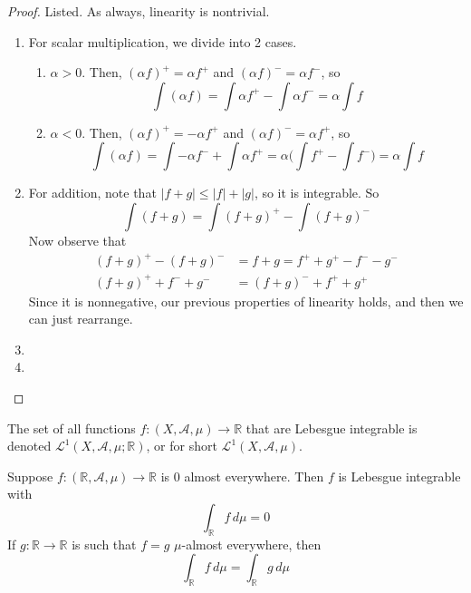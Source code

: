   \begin{proof}
    Listed. As always, linearity is nontrivial. 
    \begin{enumerate}
      \item For scalar multiplication, we divide into 2 cases. 
        \begin{enumerate}
          \item $\alpha > 0$. Then, $(\alpha f)^+ = \alpha f^+$ and $(\alpha f)^- = \alpha f^-$, so 
            \begin{equation}
              \int (\alpha f) = \int \alpha f^+ - \int \alpha f^- = \alpha \int f
            \end{equation}

          \item $\alpha < 0$. Then, $(\alpha f)^+ = - \alpha f^+$ and $(\alpha f)^- = \alpha f^+$, so 
            \begin{equation}
              \int (\alpha f) = \int -\alpha f^- + \int \alpha f^+ = \alpha \bigg( \int f^+ - \int f^- \bigg) = \alpha \int f
            \end{equation}
        \end{enumerate}
      \item For addition, note that $|f + g| \leq |f| + |g|$, so it is integrable. So 
        \begin{equation}
          \int (f + g) = \int (f + g)^+ - \int (f + g)^- 
        \end{equation}
        Now observe that 
        \begin{align}
          (f + g)^+ - (f + g)^- & = f + g = f^+ + g^+ - f^- - g^- \\ 
          (f + g)^+ + f^- + g^- & = (f + g)^- + f^+ + g^+ 
        \end{align}
        Since it is nonnegative, our previous properties of linearity holds, and then we can just rearrange. 
      \item 
      \item 
    \end{enumerate}
  \end{proof}

  \begin{definition}
    The set of all functions $f: (X, \mathcal{A}, \mu) \longrightarrow \mathbb{R}$ that are Lebesgue integrable is denoted $\mathcal{L}^1(X, \mathcal{A}, \mu; \mathbb{R})$, or for short $\mathcal{L}^1(X, \mathcal{A}, \mu)$. 
  \end{definition}

  \begin{theorem}
    Suppose $f: (\mathbb{R}, \mathcal{A}, \mu) \longrightarrow \mathbb{R}$ is $0$ almost everywhere. Then $f$ is Lebesgue integrable with 
    \begin{equation}
      \int_\mathbb{R} f \, d\mu = 0 
    \end{equation}
    If $g: \mathbb{R} \longrightarrow \mathbb{R}$ is such that $f = g$ $\mu$-almost everywhere, then
    \begin{equation}
      \int_\mathbb{R} f\, d\mu = \int_\mathbb{R} g \, d\mu
    \end{equation}
  \end{theorem}
